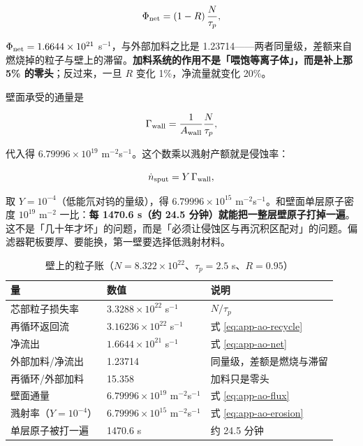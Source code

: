\begin{equation}
\Phi_{\rm net}=(1-R)\,\frac{N}{\tau_p},
\label{eq:app-ao-net}
\end{equation}

$\Phi_{\rm net}=1.6644\times10^{21}$ s$^{-1}$，与外部加料之比是 1.23714——两者同量级，差额来自燃烧掉的粒子与壁上的滞留。\textbf{加料系统的作用不是「喂饱等离子体」，而是补上那 5\% 的零头}；反过来，一旦 $R$ 变化 1\%，净流量就变化 20\%。

壁面承受的通量是

\begin{equation}
\Gamma_{\rm wall}=\frac{1}{A_{\rm wall}}\frac{N}{\tau_p},
\label{eq:app-ao-flux}
\end{equation}

代入得 $6.79996\times10^{19}$ m$^{-2}$s$^{-1}$。这个数乘以溅射产额就是侵蚀率：

\begin{equation}
\dot n_{\rm sput}=Y\,\Gamma_{\rm wall},
\label{eq:app-ao-erosion}
\end{equation}

取 $Y=10^{-4}$（低能氘对钨的量级），得 $6.79996\times10^{15}$ m$^{-2}$s$^{-1}$。和壁面单层原子密度 $10^{19}$ m$^{-2}$ 一比：\textbf{每 1470.6 s（约 24.5 分钟）就能把一整层壁原子打掉一遍}。这不是「几十年才坏」的问题，而是「必须让侵蚀区与再沉积区配对」的问题。偏滤器靶板要厚、要能换，第一壁要选择低溅射材料。

\begin{table}[htbp]
\centering
\caption{壁上的粒子账（$N=8.322\times10^{22}$、$\tau_p=2.5$ s、$R=0.95$）}
\label{tab:app-ao-recycling}
{\small
\begin{tabular}{p{4.8cm}p{3.6cm}p{6.2cm}}
\toprule
量 & 数值 & 说明 \\
\midrule
芯部粒子损失率 & $3.3288\times10^{22}$ s$^{-1}$ & $N/\tau_p$ \\
再循环返回流 & $3.16236\times10^{22}$ s$^{-1}$ & 式 \eqref{eq:app-ao-recycle} \\
净流出 & $1.6644\times10^{21}$ s$^{-1}$ & 式 \eqref{eq:app-ao-net} \\
外部加料/净流出 & 1.23714 & 同量级，差额是燃烧与滞留 \\
再循环/外部加料 & 15.358 & 加料只是零头 \\
壁面通量 & $6.79996\times10^{19}$ m$^{-2}$s$^{-1}$ & 式 \eqref{eq:app-ao-flux} \\
溅射率（$Y=10^{-4}$） & $6.79996\times10^{15}$ m$^{-2}$s$^{-1}$ & 式 \eqref{eq:app-ao-erosion} \\
单层原子被打一遍 & 1470.6 s & 约 24.5 分钟 \\
\bottomrule
\end{tabular}}
\end{table}

